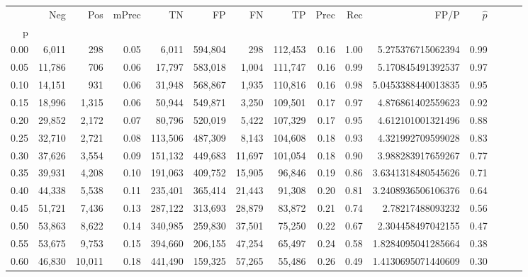 \begin{tabular}{rrrrrrrrrrrrrrr}
\toprule
{} &     Neg &     Pos & mPrec &       TN &       FP &       FN &       TP &  Prec &   Rec &                 FP/P & $\hat{p}$ \\
p    &         &         &       &          &          &          &          &       &       &                      &           \\
\midrule
0.00 &   6,011 &     298 &  0.05 &    6,011 &  594,804 &      298 &  112,453 &  0.16 &  1.00 &    5.275376715062394 &      0.99 \\
0.05 &  11,786 &     706 &  0.06 &   17,797 &  583,018 &    1,004 &  111,747 &  0.16 &  0.99 &    5.170845491392537 &      0.97 \\
0.10 &  14,151 &     931 &  0.06 &   31,948 &  568,867 &    1,935 &  110,816 &  0.16 &  0.98 &   5.0453388440013835 &      0.95 \\
0.15 &  18,996 &   1,315 &  0.06 &   50,944 &  549,871 &    3,250 &  109,501 &  0.17 &  0.97 &    4.876861402559623 &      0.92 \\
0.20 &  29,852 &   2,172 &  0.07 &   80,796 &  520,019 &    5,422 &  107,329 &  0.17 &  0.95 &    4.612101001321496 &      0.88 \\
0.25 &  32,710 &   2,721 &  0.08 &  113,506 &  487,309 &    8,143 &  104,608 &  0.18 &  0.93 &    4.321992709599028 &      0.83 \\
0.30 &  37,626 &   3,554 &  0.09 &  151,132 &  449,683 &   11,697 &  101,054 &  0.18 &  0.90 &    3.988283917659267 &      0.77 \\
0.35 &  39,931 &   4,208 &  0.10 &  191,063 &  409,752 &   15,905 &   96,846 &  0.19 &  0.86 &   3.6341318480545626 &      0.71 \\
0.40 &  44,338 &   5,538 &  0.11 &  235,401 &  365,414 &   21,443 &   91,308 &  0.20 &  0.81 &   3.2408936506106376 &      0.64 \\
0.45 &  51,721 &   7,436 &  0.13 &  287,122 &  313,693 &   28,879 &   83,872 &  0.21 &  0.74 &     2.78217488093232 &      0.56 \\
0.50 &  53,863 &   8,622 &  0.14 &  340,985 &  259,830 &   37,501 &   75,250 &  0.22 &  0.67 &    2.304458497042155 &      0.47 \\
0.55 &  53,675 &   9,753 &  0.15 &  394,660 &  206,155 &   47,254 &   65,497 &  0.24 &  0.58 &   1.8284095041285664 &      0.38 \\
0.60 &  46,830 &  10,011 &  0.18 &  441,490 &  159,325 &   57,265 &   55,486 &  0.26 &  0.49 &   1.4130695071440609 &      0.30 \\

\end{tabular}
